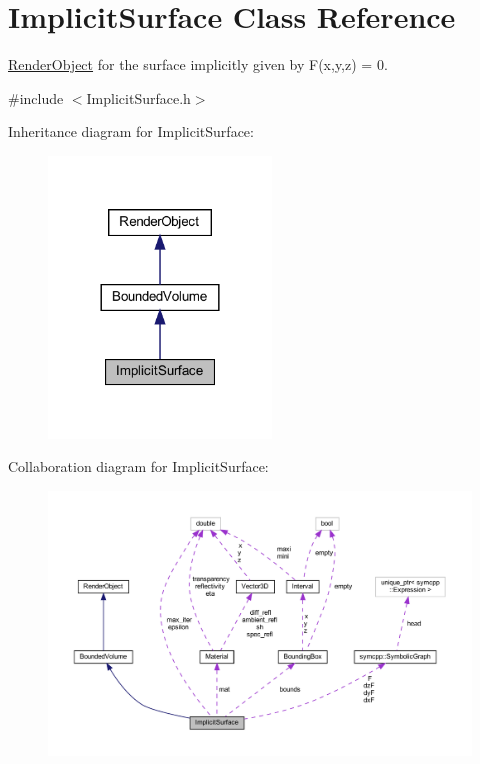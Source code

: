 \hypertarget{classImplicitSurface}{}\section{Implicit\+Surface Class Reference}
\label{classImplicitSurface}


\mbox{\hyperlink{classRenderObject}{Render\+Object}} for the surface implicitly given by F(x,y,z) = 0.  




{\ttfamily \#include $<$Implicit\+Surface.\+h$>$}



Inheritance diagram for Implicit\+Surface\+:
\nopagebreak
\begin{figure}[H]
\begin{center}
\leavevmode
\includegraphics[width=168pt]{classImplicitSurface__inherit__graph}
\end{center}
\end{figure}


Collaboration diagram for Implicit\+Surface\+:
\nopagebreak
\begin{figure}[H]
\begin{center}
\leavevmode
\includegraphics[width=350pt]{classImplicitSurface__coll__graph}
\end{center}
\end{figure}

